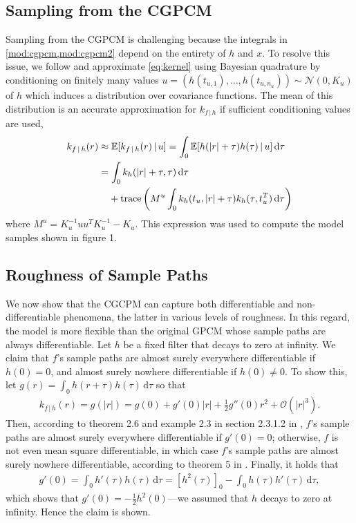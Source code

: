 \documentclass{article}
\renewcommand{\O}{\mathcal{O}} %
\newcommand{\id}[1]{\, \mathrm{d} #1}     %
\newcommand{\cond}{\, | \,}               %
\renewcommand{\ll}{\left}
\newcommand{\rr}{\right}
\newcommand{\phan}[1]{\hphantom{#1\;}}
\begin{document}
\subsection{Sampling from the CGPCM}
Sampling from the CGPCM is challenging because the integrals in \cref{mod:cgpcm,mod:cgpcm2} depend on the entirety of $h$ and $x$. To resolve this issue, we follow \citet{Tobar:2015:Learning_Stationary} and approximate \cref{eq:kernel} using Bayesian quadrature \cite{Minka:2000:Quadrature_GP} by conditioning on finitely many values $u=(h(t_{u,1}),\ldots,h(t_{u,n_u}))\sim \mathcal{N}(0,K_u)$ of $h$ which induces a  distribution over covariance functions. The mean of this distribution is an accurate approximation for $k_{f\cond h}$ if sufficient conditioning values are used,
\begin{align*}
    k_{f\cond h}(r)
    &\approx \mathbb{E}[k_{f\cond h}(r)\cond u]
    = \int_{0} \mathbb{E}[h(|r| + \tau) h(\tau)\cond u] \id{\tau} \\
    &= \int_0 k_h(|r| + \tau, \tau) \id{\tau} \\
    &\phan{=}+ \mathrm{trace} \left( M^u \int_{0} k_h(t_u, |r|+ \tau)k_h(\tau, t_u^T) \id{\tau} \right)
\end{align*}
where $M^{u}=K_u^{-1}uu^T K_u^{-1}-K_u$. This expression was used to compute the model samples shown in figure 1. %


\subsection{Roughness of Sample Paths}
\label{subsec:roughness}
We now show that the CGCPM can capture both differentiable and non-differentiable phenomena, the latter in various levels of roughness. In this regard, the model is more flexible than the original GPCM whose sample paths are always differentiable. Let $h$ be a fixed filter that decays to zero at infinity. We claim that $f$'s sample paths are almost surely everywhere differentiable if $h(0)=0$, and almost surely nowhere differentiable if $h(0)\neq 0$. To show this, let $g(r) = \int_0 h(r + \tau) h(\tau) \id{\tau}$ so that
\begin{align*}
    k_{f\cond h}(r) = \! g(|r|) \! = \! g(0) \! + \! g'(0)|r| + \frac{1}{2}g''(0)r^2 + \O(|r|^3).
\end{align*}
Then, according to theorem 2.6 and example 2.3 in section 2.3.1.2 in \cite{Lindgren:2006:Lectures_on_Stationary_Stochastic_Processes}, $f$'s sample paths are almost surely everywhere differentiable if $g'(0)=0$; otherwise, $f$ is not even mean square differentiable, in which case $f$'s sample paths are almost surely nowhere differentiable, according to theorem 5 in \cite{Cambanis:1973:On_Some_Continuity_and_Differentiability}. Finally, it holds that
\begin{align*}
    g'(0)= \int_0 h'(\tau) h(\tau) \id{\tau} = \ll[ h^2(\tau)\rr]_0 - \int_0 h(\tau) h'(\tau) \id{\tau},
\end{align*}
which shows that $g'(0) = -\frac{1}{2} h^2(0)$---we assumed that $h$ decays to zero at infinity. Hence the claim is shown.
\end{document}
